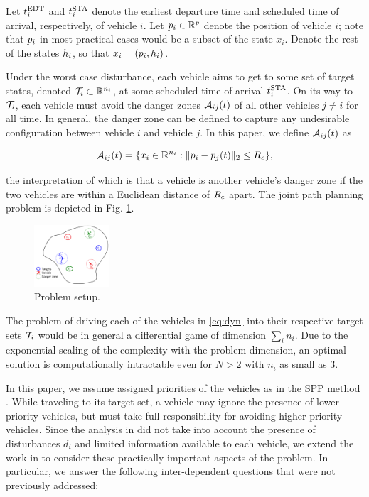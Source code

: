 Let $t^\text{EDT}_i$ and $t^\text{STA}_i$ denote the earliest departure time and scheduled time of arrival, respectively, of vehicle $i$. Let $p_i \in \mathbb{R}^p$ denote the position of vehicle $i$; note that $p_i$ in most practical cases would be a subset of the state $x_i$. Denote the rest of the states $h_i$, so that $x_i = (p_i, h_i)$. 

Under the worst case disturbance, each vehicle aims to get to some set of target states, denoted $\mathcal{T}_i \subset \mathbb{R}^{n_i}$, at some scheduled time of arrival $t^\text{STA}_i$. On its way to $\mathcal{T}_i$, each vehicle must avoid the danger zones $\mathcal{A}_{ij}(t)$ of all other vehicles $j\neq i$ for all time. In general, the danger zone can be defined to capture any undesirable configuration between vehicle $i$ and vehicle $j$. In this paper, we define $\mathcal{A}_{ij}(t)$ as

\begin{equation}
\mathcal{A}_{ij}(t) = \{x_i \in \mathbb{R}^{n_i}: \|p_i - p_j(t)\|_2 \le R_c \},
\end{equation}

\noindent the interpretation of which is that a vehicle is another vehicle's danger zone if the two vehicles are within a Euclidean distance of $R_c$ apart. The joint path planning problem is depicted in Fig. \ref{fig:form}.

\begin{figure}[h]
  \centering
  \includegraphics[width=0.25\textwidth]{"fig/formulation"}
  \caption{Problem setup.}
  \label{fig:form}
\end{figure}

The problem of driving each of the vehicles in \eqref{eq:dyn} into their respective target sets $\mathcal{T}_i$ would be in general a differential game of dimension $\sum_i n_i$. Due to the exponential scaling of the complexity with the problem dimension, an optimal solution is computationally intractable even for $N>2$ with $n_i$ as small as $3$.

In this paper, we assume assigned priorities of the vehicles as in the SPP method \cite{Chen15}. While traveling to its target set, a vehicle may ignore the presence of lower priority vehicles, but must take full responsibility for avoiding higher priority vehicles. Since the analysis in \cite{Chen15} did not take into account the presence of disturbances $d_i$ and limited information available to each vehicle, we extend the work in \cite{Chen15} to consider these practically important aspects of the problem. In particular, we answer the following inter-dependent questions that were not previously addressed:

